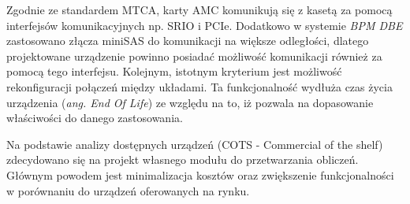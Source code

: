 Zgodnie ze standardem MTCA, karty AMC komunikują się z kasetą za pomocą interfejsów komunikacyjnych np. SRIO i PCIe. Dodatkowo w systemie \textit{BPM DBE} zastosowano złącza miniSAS do komunikacji na większe odległości, dlatego projektowane urządzenie powinno posiadać możliwość komunikacji również za pomocą tego interfejsu.  Kolejnym, istotnym kryterium jest możliwość rekonfiguracji połączeń między układami. Ta funkcjonalność wydłuża czas życia urządzenia (\textit{ang. End Of Life}) ze względu na to, iż pozwala na dopasowanie właściwości do danego zastosowania. 

Na podstawie analizy dostępnych urządzeń (COTS - Commercial of the shelf) zdecydowano się na projekt własnego modułu do przetwarzania obliczeń. Głównym powodem jest minimalizacja kosztów oraz zwiększenie funkcjonalności w porównaniu do urządzeń oferowanych na rynku.